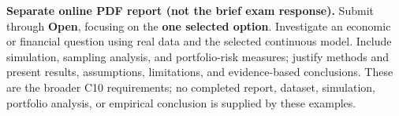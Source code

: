 {\textbf{Separate online PDF report (not the brief exam response).}
Submit through \textbf{Open}, focusing on the \textbf{one selected option}.
Investigate an economic or financial question using real data and the selected continuous model.
Include simulation, sampling analysis, and portfolio-risk measures; justify methods and present results,
assumptions, limitations, and evidence-based conclusions. These are the broader C10 requirements;
no completed report, dataset, simulation, portfolio analysis, or empirical conclusion is supplied by these examples.

\secInicio[sec:q17]
}


